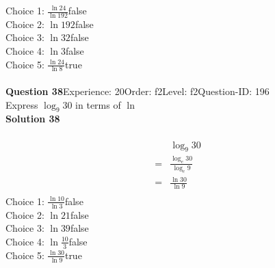 \documentclass{article}
\begin{document}
Choice 1: \hspace{20pt}$\displaystyle\frac{\ln24}{\ln192}$\hspace{20pt}false\\
Choice 2: \hspace{20pt}$\ln{192}$\hspace{20pt}false\\
Choice 3: \hspace{20pt}$\ln{32}$\hspace{20pt}false\\
Choice 4: \hspace{20pt}$\ln{3}$\hspace{20pt}false\\
Choice 5: \hspace{20pt}$\displaystyle\frac{\ln24}{\ln8}$\hspace{20pt}true\\
\\[4pt]
\noindent\textbf{Question 38}\hspace{20pt}Experience: 20\hspace{20pt}Order: f2\hspace{20pt}Level: f2\hspace{20pt}Question-ID: 196\\[2pt]
Express $\log_{9}30$ in terms of $\ln$\\[4pt]
\noindent\textbf{Solution 38}\\[2pt]
\\[-35pt]\begin{align*}
&\log_{9}30\\[2pt]
=&\displaystyle\frac{\log_{e}30}{\log_{e}9}\\[2pt]
=&\displaystyle\frac{\ln30}{\ln9}\\[-100pt]
\end{align*}
Choice 1: \hspace{20pt}$\displaystyle\frac{\ln10}{\ln3}$\hspace{20pt}false\\
Choice 2: \hspace{20pt}$\ln{21}$\hspace{20pt}false\\
Choice 3: \hspace{20pt}$\ln{39}$\hspace{20pt}false\\
Choice 4: \hspace{20pt}$\ln{\displaystyle\frac{10}{3}}$\hspace{20pt}false\\
Choice 5: \hspace{20pt}$\displaystyle\frac{\ln30}{\ln9}$\hspace{20pt}true\\
\end{document}
